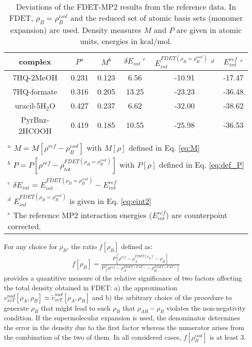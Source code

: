 \documentclass[journal=jctcce,manuscript=article]{achemso}
\begin{document}
\begin{table*}
{
\begin{center}
\begin{tabular}{|c|c|c|c|c|c|}
\hline
 complex & $P^a$ & $M^b$ & $\delta E_{int}\;^c$&$E^{FDET(\rho_B=\rho_B^{isol})}_{int}$ $^d$&$E_{int}^{ref}$ $^e$ \\ \hline
7HQ-2MeOH &0.231& 0.123 & 6.56 &-10.91 & -17.47 \\ \hline
7HQ-formate &0.316& 0.205 &  13.25&-23.23 & -36.48 \\ \hline
uracil-5H$_2$O &0.427&  0.237 & 6.62&-32.00 & -38.62 \\ \hline
PyrBnz-2HCOOH  &0.419& 0.185 & 10.55&-25.98 &  -36.53 \\ \hline
\multicolumn{6}{c}{ } \\
\multicolumn{6}{l}{$^a$ $M=M[\rho^{ref} - \rho^{isol}_{B}]$ with $M[\rho]$ defined in Eq. \ref{eq:M}}\\
\multicolumn{6}{l}{$^b$ $P=P[\rho^{ref} - \rho_{tot}^{FDET(\rho_B=\rho_B^{isol})}]$ with $P[\rho]$ defined in Eq. \ref{eq:def_P}}\\
\multicolumn{6}{l}{$^c$ $\delta E_{int}=E^{FDET(\rho_B=\rho_B^{isol})}_{int}-E_{int}^{ref}$} \\
\multicolumn{6}{l}{$^d$ $E^{FDET(\rho_B=\rho_B^{isol})}_{int}$ is given in Eq. \ref{eq:eint2}}\\
\multicolumn{6}{l}{$^e$ The reference MP2 interaction energies ($E_{int}^{ref}$) are counterpoint corrected.}
\end{tabular}
\end{center}
}%
\caption{Deviations of the FDET-MP2 results from the reference data.  In FDET, $\rho_B=\rho_B^{isol}$  and the reduced set of atomic basis sets (monomer  expansion) are used. 
Density measures $M$ and $P$ are given in atomic units, energies in kcal/mol.
}
\label{table:ME_isol}
\end{table*}

For any choice for $\rho_B$,
the ratio $f[\rho_B]$ defined as:
\begin{eqnarray}
f[\rho_B]=\frac{P[\rho^{ref} - \rho_{A}^{FDET(\rho_{B})}-\rho_{B}]}{P[\rho^{ref} - \rho_{A}^{FDET(FAT)}-\rho_{B}^{FDET(FAT)}]}
\end{eqnarray}
provides a quantitive measure of the relative significance of two factors affecting the total density obtained in FDET:
a) the approximation $v_{xcT}^{nad}[\rho_A,\rho_B]\approx \tilde{v}_{xcT}^{nad}[\rho_A,\rho_B]$  and b) the arbitrary choice of the procedure to generate $\rho_B$ that might lead to such $\rho_B$ that  
$\rho_{AB}-\rho_B$ violates the non-negativity condition.
If the supermolecular expansion is used, the denominator determines the error in the density due to the first factor whereas the numerator arises from the combination of the two of them.
In all considered cases,  $f[\rho_B^{isol}]$ is at least 3.
\end{document}

